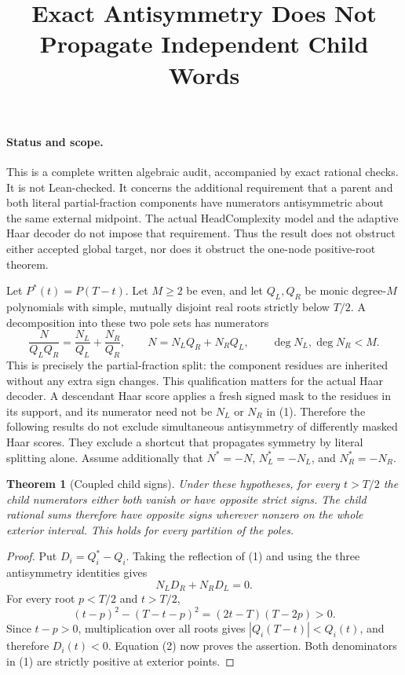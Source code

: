 \documentclass[11pt]{article}
\title{Exact Antisymmetry Does Not Propagate Independent Child Words}
\author{}\date{}
\newtheorem{theorem}{Theorem}
\begin{document}
\maketitle
\paragraph{Status and scope.}
This is a complete written algebraic audit, accompanied by exact rational
checks. It is not Lean-checked. It concerns the additional requirement
that a parent and both literal partial-fraction components have numerators
antisymmetric about the same external midpoint. The actual HeadComplexity
model and the adaptive Haar decoder do not impose that requirement.
Thus the result does not obstruct either accepted global target, nor
does it obstruct the one-node positive-root theorem.

Let $P^\ast(t)=P(T-t)$. Let $M\geq2$ be even, and let $Q_L,Q_R$ be
monic degree-$M$ polynomials with simple, mutually disjoint real roots
strictly below $T/2$. A decomposition into these two pole sets has
numerators
\[
 \frac{N}{Q_LQ_R}=\frac{N_L}{Q_L}+\frac{N_R}{Q_R},\qquad
 N=N_LQ_R+N_RQ_L,\qquad \deg N_L,\deg N_R<M.                 \tag{1}
\]
This is precisely the partial-fraction split: the component residues are
inherited without any extra sign changes. This qualification matters for
the actual Haar decoder. A descendant Haar score applies a fresh signed
mask to the residues in its support, and its numerator need not be $N_L$
or $N_R$ in (1). Therefore the following results do not exclude simultaneous
antisymmetry of differently masked Haar scores. They exclude a shortcut
that propagates symmetry by literal splitting alone.
Assume additionally that
$N^\ast=-N$, $N_L^\ast=-N_L$, and $N_R^\ast=-N_R$.

\begin{theorem}[Coupled child signs]
Under these hypotheses, for every $t>T/2$ the child numerators either
both vanish or have opposite strict signs. The child rational sums
therefore have opposite signs wherever nonzero on the whole exterior
interval. This holds for every partition of the poles.
\end{theorem}
\begin{proof}
Put $D_i=Q_i^\ast-Q_i$. Taking the reflection of (1) and using the three
antisymmetry identities gives
\[
 N_LD_R+N_RD_L=0.                                            \tag{2}
\]
For every root $p<T/2$ and $t>T/2$,
\[
 (t-p)^2-(T-t-p)^2=(2t-T)(T-2p)>0.
\]
Since $t-p>0$, multiplication over all roots gives
$|Q_i(T-t)|<Q_i(t)$, and therefore $D_i(t)<0$.
Equation (2) now proves the assertion. Both denominators in (1) are
strictly positive at exterior points.
\end{proof}
\end{document}
